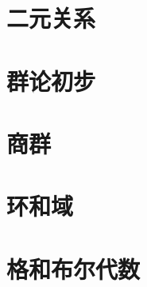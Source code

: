 \documentclass[UTF8]{ctexart}
\begin{document}
\newpage

\section{二元关系}

\newpage

\section{群论初步}

\newpage

\section{商群}

\newpage

\section{环和域}

\newpage

\section{格和布尔代数}
\end{document}
